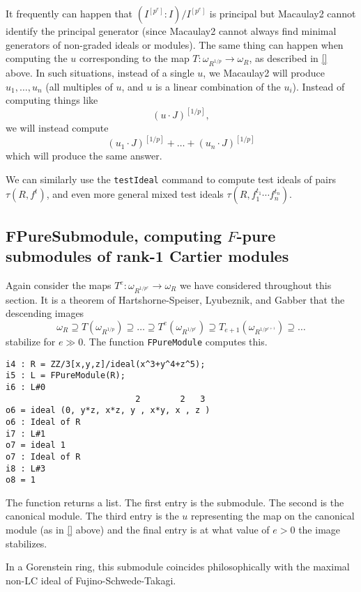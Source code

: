 \documentclass[11pt]{amsart}
\begin{document}
\begin{remark}
It frequently can happen that $(I^{[p^e]} : I)/I^{[p^e]}$ is principal but Macaulay2 cannot identify the principal generator (since Macaulay2 cannot always find minimal generators of non-graded ideals or modules).  The same thing can happen when computing the $u$ corresponding to the map $T : \omega_{R^{1/p}} \to \omega_R$, as described in \autoref{} above.  In such situations, instead of a single $u$, we Macaulay2 will produce $u_1, \dots, u_n$ (all multiples of $u$, and $u$ is a linear combination of the $u_i$).  Instead of computing things like
\[
(u \cdot J)^{[1/p]},
\]
we will instead compute
\[
(u_1 \cdot J)^{[1/p]} + \dots + (u_n \cdot J)^{[1/p]}
\]
which will produce the same answer.
\end{remark}

We can similarly use the {\tt testIdeal} command to compute test ideals of pairs $\tau(R, f^t)$, and even more general mixed test ideals $\tau(R, f_1^{t_1} \cdots f_n^{t_n})$.

\subsection{FPureSubmodule, computing $F$-pure submodules of rank-1 Cartier modules}

Again consider the maps $T^e : \omega_{R^{1/p^e}} \to \omega_R$ we have considered throughout this section.  It is a theorem of Hartshorne-Speiser, Lyubeznik, and Gabber \cite{} that the descending images
\[
\omega_R \supseteq T(\omega_{R^{1/p}}) \supseteq \dots \supseteq T^e(\omega_{R^{1/p^e}}) \supseteq T_{e+1}(\omega_{R^{1/p^{e+1}}}) \supseteq \dots
\]
stabilize for $e \gg 0$.  The function {\tt FPureModule} computes this.
\begin{verbatim}
i4 : R = ZZ/3[x,y,z]/ideal(x^3+y^4+z^5);
i5 : L = FPureModule(R);
i6 : L#0
                          2        2   3
o6 = ideal (0, y*z, x*z, y , x*y, x , z )
o6 : Ideal of R
i7 : L#1
o7 = ideal 1
o7 : Ideal of R
i8 : L#3
o8 = 1
\end{verbatim}
The function returns a list.  The first entry is the submodule.  The second is the canonical module.  The third entry is the $u$ representing the map on the canonical module (as in \autoref{} above) and the final entry is at what value of $e > 0$ the image stabilizes.

In a Gorenstein ring, this submodule coincides philosophically with the maximal non-LC ideal of Fujino-Schwede-Takagi.
\end{document}
